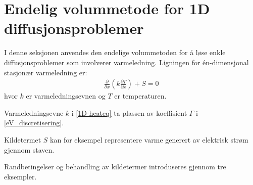 \section{Endelig volummetode for 1D diffusjonsproblemer}
I denne seksjonen anvendes den endelige volummetoden for å løse enkle diffusjonsproblemer som involverer varmeledning. Ligningen for én-dimensjonal stasjonær varmeledning er:
\begin{align}\label{1D-heateq}
\frac{\partial}{\partial x} \left( k \frac{\partial T}{\partial x} \right) + S = 0
\end{align}
hvor $k$ er varmeledningsevnen og $T$ er temperaturen.
\begin{rem}{}
Varmeledningsevne $k$ i \eqref{1D-heateq} ta plassen av koeffisient $\Gamma$ i \eqref{eV_discretisering}.

Kildetermet $S$ kan for eksempel representere varme generert av elektrisk strøm gjennom staven.
\end{rem}
 Randbetingelser og behandling av kildetermer introduseres gjennom tre eksempler.

